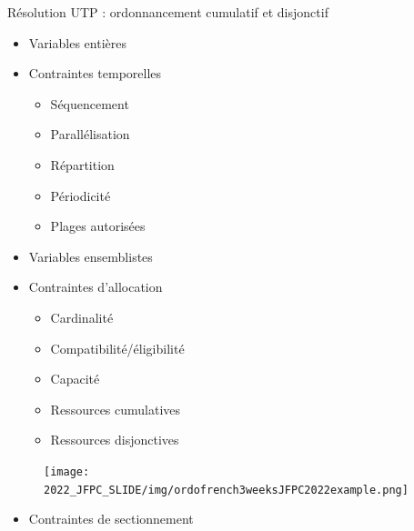 \documentclass{beamer}
\begin{document}
\begin{frame}{Résolution UTP : ordonnancement cumulatif et disjonctif}
    \begin{minipage}{0.49\textwidth}
    \begin{itemize}
    \item Variables entières
    \item Contraintes temporelles
        \begin{itemize}
            \item Séquencement
            \item Parallélisation
            \item Répartition
            \item Périodicité
            \item Plages autorisées
        \end{itemize}
    \end{itemize}
    \end{minipage}
    \begin{minipage}{0.49\textwidth}
        \begin{itemize}
    \item Variables ensemblistes
    \item Contraintes d'allocation
        \begin{itemize}
            \item Cardinalité %
            \item Compatibilité/éligibilité %
            \item Capacité
            \item Ressources cumulatives %
            \item Ressources disjonctives %
        \end{itemize}
    \end{itemize}
    \end{minipage}
                \begin{figure}
            \centering
            \texttt{[image: 2022\_JFPC\_SLIDE/img/ordofrench3weeksJFPC2022example.png]}
            \end{figure}
            \begin{itemize}
                \item Contraintes de sectionnement
            \end{itemize}
\end{frame}
\end{document}
